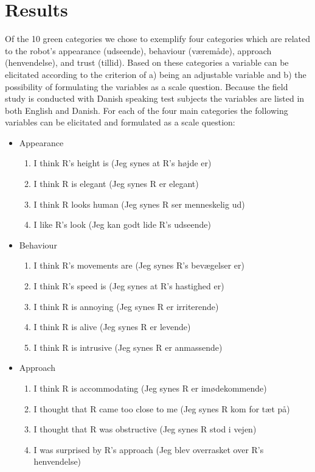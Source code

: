 \section{Results}
\label{Results}
%
Of the 10 green categories we chose to exemplify four categories which are related to the robot’s appearance (udseende), behaviour (væremåde), approach (henvendelse), and trust (tillid). Based on these categories a variable can be elicitated according to the criterion of a) being an adjustable variable and b) the possibility of formulating the variables as a scale question. Because the field study is conducted with Danish speaking test subjects the variables are listed in both English and Danish. For each of the four main categories the following variables can be elicitated and formulated as a scale question:\\
%
\begin{itemize}
\item Appearance
\begin{enumerate}
  \item I think R's height is (Jeg synes at R's højde er)
  \item I think R is elegant (Jeg synes R er elegant)
  \item I think R looks human (Jeg synes R ser menneskelig ud)
  \item I like R's look (Jeg kan godt lide R's udseende)
\end{enumerate}
\item Behaviour
\begin{enumerate}
  \item I think R's movements are (Jeg synes R's bevægelser er)
  \item I think R's speed is (Jeg synes at R's hastighed er)
  \item I think R is annoying (Jeg synes R er irriterende)
  \item I think R is alive (Jeg synes R er levende)
  \item I think R is intrusive (Jeg synes R er anmassende)
\end{enumerate}
\item Approach 
\begin{enumerate}
  \item I think R is accommodating (Jeg synes R er imødekommende)
  \item I thought that R came too close to me (Jeg synes R kom for tæt på)
  \item I thought that R was obstructive (Jeg synes R stod i vejen)
  \item I was surprised by R's approach (Jeg blev overrasket over R's henvendelse)

\end{enumerate}
\end{itemize}
